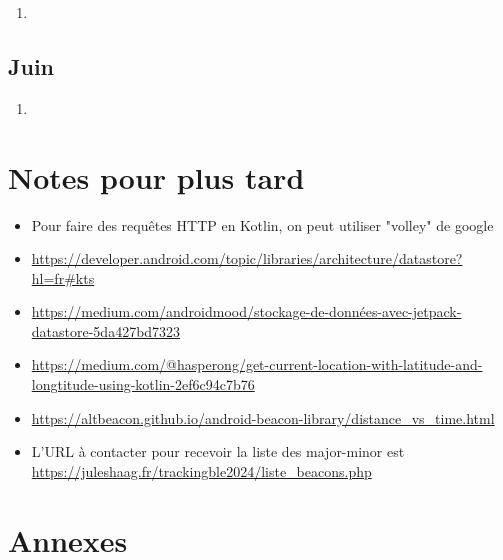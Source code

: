 \documentclass[10pt,a4paper]{book}
\begin{document}
\begin{enumerate}
    \item 
\end{enumerate}

\chapter{Juin}

\begin{enumerate}
    \item 
\end{enumerate}

\part{Notes pour plus tard}

\begin{itemize}
    \item Pour faire des requêtes HTTP en Kotlin, on peut utiliser "volley" de google
    \item \href{https://developer.android.com/topic/libraries/architecture/datastore?hl=fr\#kts}{https://developer.android.com/topic/libraries/architecture/datastore?hl=fr\#kts}
    \item \href{https://medium.com/androidmood/stockage-de-données-avec-jetpack-datastore-5da427bd7323}{https://medium.com/androidmood/stockage-de-données-avec-jetpack-datastore-5da427bd7323}
    \item \href{https://medium.com/@hasperong/get-current-location-with-latitude-and-longtitude-using-kotlin-2ef6c94c7b76}{https://medium.com/@hasperong/get-current-location-with-latitude-and-longtitude-using-kotlin-2ef6c94c7b76}
    \item \href{https://altbeacon.github.io/android-beacon-library/distance\_vs\_time.html}{https://altbeacon.github.io/android-beacon-library/distance\_vs\_time.html}
    \item L'URL à contacter pour recevoir la liste des major-minor est \href{https://juleshaag.fr/trackingble2024/liste\_beacons.php}{https://juleshaag.fr/trackingble2024/liste\_beacons.php}
\end{itemize}

\part{Annexes}
\end{document}
